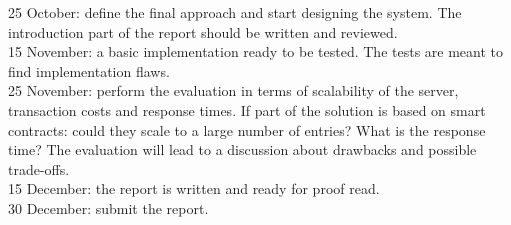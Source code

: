 \documentclass[paper=a4, fontsize=11pt]{scrartcl} %
\numberwithin{equation}{section} %
\numberwithin{figure}{section} %
\numberwithin{table}{section} %
\begin{document}
25 October: define the final approach and start designing the system. The introduction part of the report should be written and reviewed. \\

15 November: a basic implementation ready to be tested. The tests are meant to find implementation flaws. \\

25 November: perform the evaluation in terms of scalability of the server, transaction costs and response times. If part of the solution is based on smart contracts: could they scale to a large number of entries? What is the response time? The evaluation will lead to a discussion about drawbacks and possible trade-offs. \\

15 December: the report is written and ready for proof read. \\

30 December: submit the report. \\

\printbibliography
% 
\end{document}
